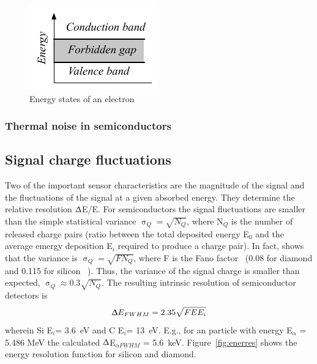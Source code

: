 \documentclass[11pt]{mytustyle}  %
\begin{document}
\begin{figure}[!t]
\begin{center}
\includegraphics[width=0.4\linewidth]{plots/energygap}
\caption{Energy states of an electron}
\label{fig:energygap}
\end{center}
\end{figure}




\subsubsection{Thermal noise in semiconductors}







\subsection{Signal charge fluctuations}
Two of the important sensor characteristics are the magnitude of the signal and the fluctuations of the signal at a given absorbed energy. They determine the relative resolution $\Updelta$E/E. For semiconductors the signal fluctuations are smaller than the simple statistical variance $\upsigma_Q=\sqrt{N_Q}$, where N$_Q$ is the number of released charge pairs (ratio between the total deposited energy E$_0$ and the average emergy deposition E$_i$ required to produce a charge pair). In fact, \cite{} shows that the variance is $\upsigma_Q=\sqrt{F N_Q}$, where F is the Fano factor~\cite{} (0.08 for diamond and 0.115 for silicon ~\cite{}). Thus, the variance of the signal charge is smaller than expected, $\upsigma_Q\approx0.3 \sqrt{N_Q}$. The resulting intrinsic resolution of semiconductor detectors is 
\begin{equation}
\label{eq:efwhm}
\Updelta E_{FWHM} = 2.35 \sqrt{FEE_i} 
\end{equation} 
wherein Si E$_i$= 3.6~eV and C E$_i$= 13~eV. E.g., for an \ga particle with energy E$_\alpha$ = 5.486 MeV the calculated $\Updelta$E$_{\alpha FWHM}$ = 5.6~keV. Figure~\ref{fig:enerres} shows the energy resolution function for silicon and diamond.
\end{document}
